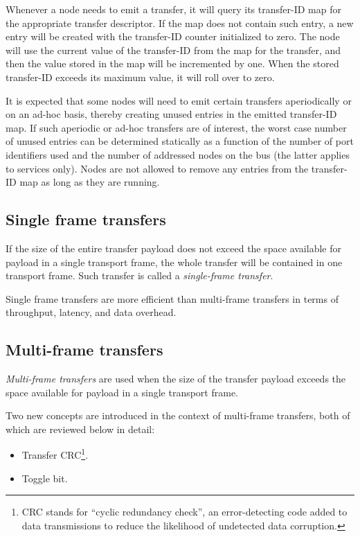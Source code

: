 Whenever a node needs to emit a transfer, it will query its transfer-ID map for the appropriate transfer descriptor.
If the map does not contain such entry, a new entry will be created with the transfer-ID counter initialized to zero.
The node will use the current value of the transfer-ID from the map for the transfer,
and then the value stored in the map will be incremented by one.
When the stored transfer-ID exceeds its maximum value, it will roll over to zero.

It is expected that some nodes will need to emit certain transfers aperiodically or on an ad-hoc basis,
thereby creating unused entries in the emitted transfer-ID map.
If such aperiodic or ad-hoc transfers are of interest,
the worst case number of unused entries can be determined statically as a function of the number of
port identifiers used and the number of addressed nodes on the bus (the latter applies to services only).
Nodes are not allowed to remove any entries from the transfer-ID map as long as they are running.

\subsection{Single frame transfers}

If the size of the entire transfer payload does not exceed the space available for payload in a single transport frame,
the whole transfer will be contained in one transport frame.
Such transfer is called a \emph{single-frame transfer}.

Single frame transfers are more efficient than multi-frame transfers in terms of throughput, latency,
and data overhead.

\subsection{Multi-frame transfers}\label{sec:transport_multi_frame_transfers}

\emph{Multi-frame transfers} are used when the size of the transfer payload exceeds the space available
for payload in a single transport frame.

Two new concepts are introduced in the context of multi-frame transfers, both of which are reviewed below in detail:
\begin{samepage}
\begin{itemize}
    \item Transfer CRC\footnote{CRC stands for ``cyclic redundancy check'', an error-detecting code
    added to data transmissions to reduce the likelihood of undetected data corruption.}.
    \item Toggle bit.
\end{itemize}
\end{samepage}

